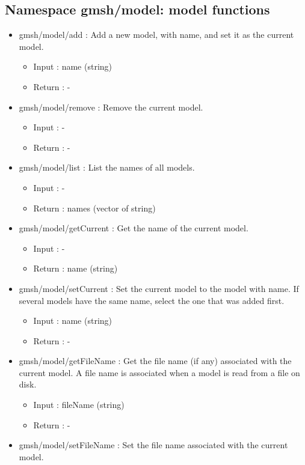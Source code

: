 \documentclass[dvipdfmx, 9pt, a4paper]{article}
\numberwithin{equation}{section}
\begin{document}
\subsection{Namespace gmsh/model: model functions}
\begin{itemize}
\item gmsh/model/add : Add a new model, with name, and set it as the current model.
\begin{itemize}
\item Input : name (string)
\item Return : -
\end{itemize}
\item gmsh/model/remove : Remove the current model.
\begin{itemize}
\item Input : -
\item Return : -
\end{itemize}
\item gmsh/model/list : List the names of all models.
\begin{itemize}
\item Input : -
\item Return : names (vector of string)
\end{itemize}
\item gmsh/model/getCurrent : Get the name of the current model.
\begin{itemize}
\item Input : -
\item Return : name (string)
\end{itemize}
\item gmsh/model/setCurrent : Set the current model to the model with name. If several models have the same name, select the one that was added first.
\begin{itemize}
\item Input : name (string)
\item Return : -
\end{itemize}
\item gmsh/model/getFileName : Get the file name (if any) associated with the current model. A file name is associated when a model is read from a file on disk.
\begin{itemize}
\item Input : fileName (string)
\item Return : -
\end{itemize}
\item gmsh/model/setFileName : Set the file name associated with the current model.

\end{itemize}
\end{document}
